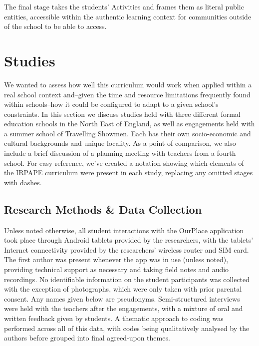 \documentclass[,hyphens]{sigchi}
\begin{document}
The final stage takes the students' Activities and frames them as literal public entities, accessible within the authentic learning context for communities outside of the school to be able to access.

\section{Studies}

We wanted to assess how well this curriculum would work when applied within a real school context and--given the time and resource limitations frequently found within schools--how it could be configured to adapt to a given school's constraints. In this section we discuss studies held with three different formal education schools in the North East of England, as well as engagements held with a summer school of Travelling Showmen. Each has their own socio-economic and cultural backgrounds and unique locality. As a point of comparison, we also include a brief discussion of a planning meeting with teachers from a fourth school. For easy reference, we've created a notation showing which elements of the IRPAPE curriculum were present in each study, replacing any omitted stages with dashes.

\subsection{Research Methods \& Data Collection}

Unless noted otherwise, all student interactions with the OurPlace application took place through Android tablets provided by the researchers, with the tablets' Internet connectivity provided by the researchers' wireless router and SIM card. The first author was present whenever the app was in use (unless noted), providing technical support as necessary and taking field notes and audio recordings. No identifiable information on the student participants was collected with the exception of photographs, which were only taken with prior parental consent. Any names given below are pseudonyms. Semi-structured interviews were held with the teachers after the engagements, with a mixture of oral and written feedback given by students. A thematic approach to coding was performed across all of this data, with codes being qualitatively analysed by the authors before grouped into final agreed-upon themes.
\end{document}
